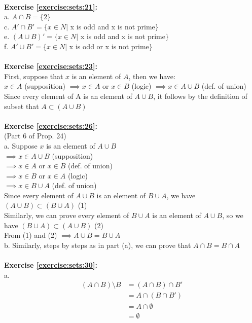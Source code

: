 \\
\textbf{Exercise \ref{exercise:sets:21}:}\\
a. $A\cap B=\{2\}$\\
c. $A'\cap B'=\{x\in N|$ x is odd and x is not prime$\}$\\
e. $(A\cup B)'=\{x\in N|$ x is odd and x is not prime$\}$\\
f. $A'\cup B'=\{x\in N|$ x is odd or x is not prime$\}$\\
\\
\textbf{Exercise \ref{exercise:sets:23}:}\\
First, suppose that $x$ is an element of $A$, then we have:\\
$x\in A$ (supposition) $\implies x\in A$ or $x\in B$ (logic) $\implies x\in A\cup B$ (def. of union)\\
Since every element of A is an element of $A\cup B$, it follows by the definition of subset that $A\subset (A\cup B)$\\
\\
\textbf{Exercise \ref{exercise:sets:26}:}\\
(Part 6 of Prop. 24)\\
a. Suppose $x$ is an element of $A\cup B$\\
$\implies x\in A\cup B$ (supposition)\\
$\implies x\in A$ or $x\in B$ (def. of union)\\
$\implies x\in B$ or $x\in A$ (logic)\\
$\implies x\in B\cup A$ (def. of union)\\
Since every element of $A\cup B$ is an element of $B\cup A$, we have $(A\cup B)\subset(B\cup A)$ (1)\\
Similarly, we can prove every element of $B\cup A$ is an element of $A\cup B$, so we have $(B\cup A)\subset (A\cup B)$ (2)\\
From (1) and (2) $\implies A\cup B = B\cup A$\\
b. Similarly, steps by steps as in part (a), we can prove that $A\cap B=B\cap A$\\
\\
\textbf{Exercise \ref{exercise:sets:30}:}\\
a.\begin{align*}
(A\cap B) \setminus B & =(A\cap B)\cap B'\\
& = A\cap (B\cap B')\\
& = A\cap \emptyset\\
& = \emptyset\\
\end{align*}
